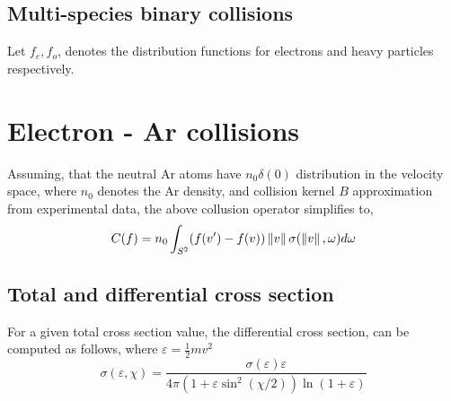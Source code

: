 \documentclass{article}
\begin{document}
\subsection{Multi-species binary collisions}
\label{sec:multispecies_collissions}
Let $f_e,f_o$, denotes the distribution functions for electrons and heavy particles respectively. 





\section{Electron - Ar collisions}
\label{sec:col_op_torch}

Assuming, that the neutral Ar atoms have $n_0\delta(0)$ distribution in the velocity space, where $n_0$ denotes the Ar density, and collision kernel $B$ approximation from experimental data, the above collusion operator simplifies to,
\begin{equation}
    C(f) = n_0 \int_{S^2} (f(v^\prime) - f(v)) \left\lVert v\right\rVert \sigma(\left\lVert v\right\rVert,\omega) d\omega
\end{equation}

\subsection{Total and differential cross section}
For a given total cross section value, the differential cross section, can be computed as follows\cite{vahedi1995monte}, where $\varepsilon= \frac{1}{2}mv^2$
\begin{equation}
    \sigma(\varepsilon,\chi) = \frac{\sigma(\varepsilon)\varepsilon}{4\pi (1 + \varepsilon \sin^2(\chi/2))\ln(1+\varepsilon)} 
\end{equation}
\end{document}
